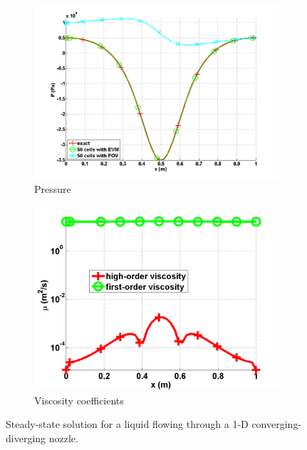 \begin{figure}[H]
        \begin{subfigure}[b]{0.495\textwidth}
                \centering
                \includegraphics[width=\textwidth]{figures/liquid_pressure_numerical_and_exact_50.png}
                \caption{Pressure}
                \label{fig:1d_nozzle_liq_press}
        \end{subfigure}
        
        \begin{subfigure}[b]{0.495\textwidth}
                \centering
                \includegraphics[width=\textwidth]{figures/liquid_viscosity_numerical50.png}
                \caption{Viscosity coefficients}
                \label{fig:1d_nozzle_liq_visc}
        \end{subfigure}
        \caption{Steady-state solution for a liquid flowing through a 1-D converging-diverging nozzle.}\label{fig:1d_liq_nozzle}
\end{figure}
